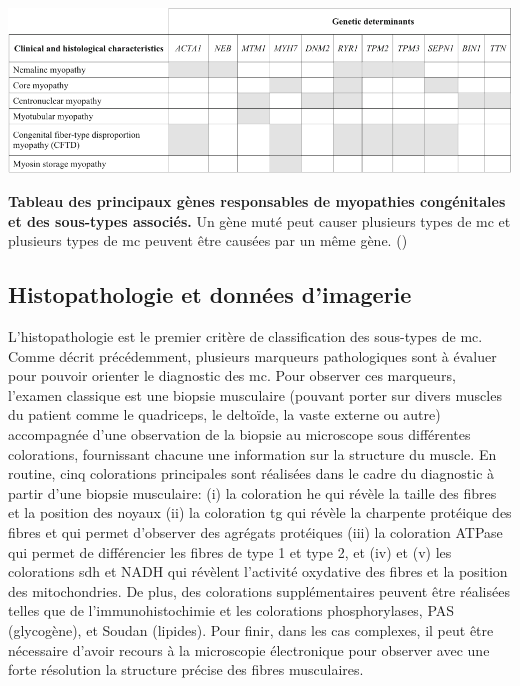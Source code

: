 \begin{table}[!ht]
\centering
\includegraphics[width=1\textwidth]{figures/gene_tab.png}
\caption[Tableau des principaux gènes responsables de myopathies congénitales et des sous-types associés]{\textbf{Tableau des principaux gènes responsables de myopathies congénitales et des sous-types associés.} Un gène muté peut causer plusieurs types de \gls{mc} et plusieurs types de \gls{mc} peuvent être causées par un même gène. (\cite{cassandrini_congenital_2017})} 
\label{tab:gene_myo}
\end{table}

\subsection{Histopathologie et données d'imagerie }
L'histopathologie est le premier critère de classification des sous-types de \gls{mc}. Comme décrit précédemment, plusieurs marqueurs pathologiques sont à évaluer pour pouvoir orienter le diagnostic des \gls{mc}. Pour observer ces marqueurs, l'examen classique est une biopsie musculaire (pouvant porter sur divers muscles du patient comme le quadriceps, le deltoïde, la vaste externe ou autre) accompagnée d'une observation de la biopsie au microscope sous différentes colorations, fournissant chacune une information sur la structure du muscle. En routine, cinq colorations principales sont réalisées dans le cadre du diagnostic à partir d'une biopsie musculaire: (i) la coloration \gls{he} qui révèle la taille des fibres et la position des noyaux (ii) la coloration \gls{tg} qui révèle la charpente protéique des fibres et qui permet d'observer des agrégats protéiques (iii) la coloration ATPase qui permet de différencier les fibres de type 1 et type 2, et (iv) et (v) les colorations \gls{sdh} et NADH qui révèlent l'activité oxydative des fibres et la position des mitochondries. De plus, des colorations supplémentaires peuvent être réalisées telles que de l'immunohistochimie et les colorations phosphorylases, PAS (glycogène), et Soudan (lipides). Pour finir, dans les cas complexes, il peut être nécessaire d'avoir recours à la microscopie électronique pour observer avec une forte résolution la structure précise des fibres musculaires.

